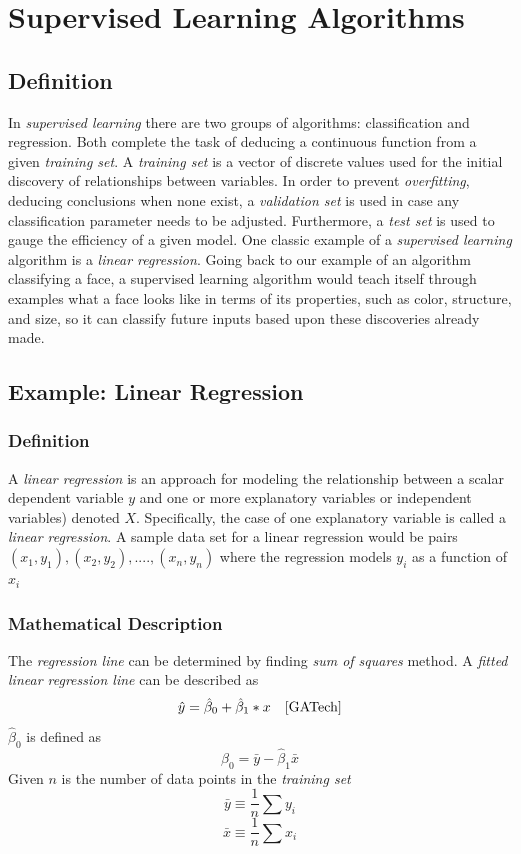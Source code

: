 \documentclass[12pt]{article}
\begin{document}
\section{Supervised Learning Algorithms}
\subsection{Definition}
In \textit{supervised learning} there are two groups of algorithms: classification and regression. Both complete the task of deducing a continuous function from a given \textit{training set}. \cite{Ng} A \textit{training set} is a vector of discrete values used for the initial discovery of relationships between variables. In order to prevent \textit{overfitting}, deducing conclusions when none exist, a \textit{validation set} is used in case any classification parameter needs to be adjusted. Furthermore, a \textit{test set} is used to gauge the efficiency of a given model. \cite{Ng} One classic example of a \textit{supervised learning} algorithm is a \textit{linear regression}. Going back to our example of an algorithm classifying a face, a supervised learning algorithm would teach itself through examples what a face looks like in terms of its properties, such as color, structure, and size, so it can classify future inputs based upon these discoveries already made.
\subsection{Example: Linear Regression}
\subsubsection{Definition}
A \textit{linear regression} is an approach for modeling the relationship between a scalar dependent variable $y$ and one or more explanatory variables or independent variables) denoted $X$. Specifically, the case of one explanatory variable is called a \textit{linear regression}. A sample data set for a linear regression would be pairs $(x_1,y_1),(x_2,y_2),....,(x_n,y_n)$ where the regression models $y_i$ as a function of $x_i$
\subsubsection{Mathematical Description}
The \textit{regression line} can be determined by finding \textit{sum of squares} method. A
\textit{fitted linear regression line} can be described as
\begin{equation}
\hat y=\hat \beta_{0}+\hat \beta_1*x \, \, \, \, \, \,\cite{GATech}
\end{equation}
$\hat \beta_0$ is defined as 
\begin{equation}
	\hat \beta_0 = \bar y - \hat \beta_1 \bar x
\end{equation}
Given $n$ is the number of data points in the \textit{training set}\\
\begin{equation}
	\bar y \equiv \frac{1}{n} \sum y_i
\end{equation}
\begin{equation}
	\bar x \equiv \frac{1}{n}\sum x_i	
\end{equation}
\end{document}
